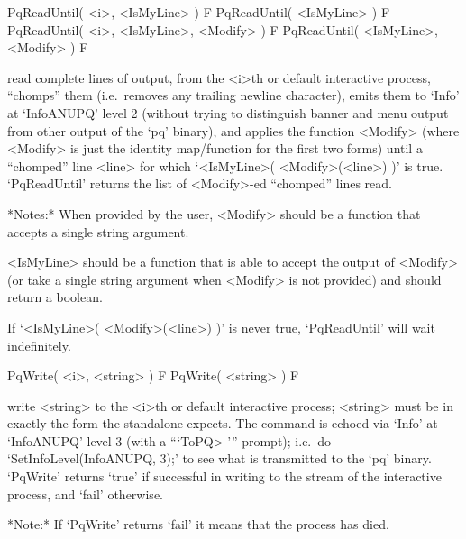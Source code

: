 \>PqReadUntil( <i>, <IsMyLine> ) F
\>PqReadUntil( <IsMyLine> ) F
\>PqReadUntil( <i>, <IsMyLine>, <Modify> ) F
\>PqReadUntil( <IsMyLine>, <Modify> ) F

read complete lines  of  {\ANUPQ}  output,  from  the  <i>th  or  default
interactive {\ANUPQ} process, ``chomps'' them (i.e.~removes any  trailing
newline character), emits them to `Info' at `InfoANUPQ' level 2  (without
trying to distinguish banner and menu output from  other  output  of  the
`pq' binary), and applies the function <Modify> (where <Modify>  is  just
the identity map/function for the first two forms)  until  a  ``chomped''
line  <line>  for  which  `<IsMyLine>(  <Modify>(<line>)  )'   is   true.
`PqReadUntil' returns the list of <Modify>-ed ``chomped'' lines read.

*Notes:* 
When provided by the user, <Modify> should be a function that  accepts  a
single string argument.

<IsMyLine> should be a function that is able  to  accept  the  output  of
<Modify> (or take a single string argument when <Modify> is not provided)
and should return a boolean.

If `<IsMyLine>( <Modify>(<line>) )' is  never  true,  `PqReadUntil'  will
wait indefinitely.

\>PqWrite( <i>, <string> ) F
\>PqWrite( <string> ) F

write <string> to the <i>th  or  default  interactive  {\ANUPQ}  process;
<string> must be in exactly the form the {\ANUPQ} standalone expects. The
command is echoed via `Info' at `InfoANUPQ' level 3 (with a  ```ToPQ> '''
prompt); i.e.~do `SetInfoLevel(InfoANUPQ, 3);' to see what is transmitted
to the `pq' binary. `PqWrite' returns `true' if successful in writing  to
the stream of the interactive {\ANUPQ} process, and `fail' otherwise.

*Note:*
If `PqWrite' returns `fail' it means that the {\ANUPQ} process has died.

